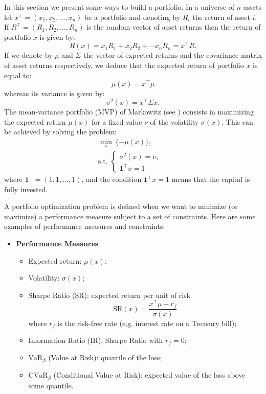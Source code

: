 In this section we present some ways to build a portfolio. In a universe of $n$ assets let $x^\top = (x_1, x_2, \dots, x_n)$ be a portfolio and denoting by $R_i$ the return of asset $i$. If $R^\top=(R_1, R_2, \dots, R_n)$  is the random vector of asset returns then the return of portfolio $x$ is given by:
\[
	R(x) = x_1R_1+x_2R_2+\cdots x_nR_n = x^\top R.
\]
If we denote by $\mu$ and $\Sigma$ the vector of expected returns and the covariance matrix of asset returns respectively, we deduce that the expected return of portfolio $x$ is equal to:
\[
	\mu(x) = x^\top \mu
\]
whereas its variance is given by:
\[
	\sigma^2(x) = x^\top \Sigma x.
\]
The mean-variance portfolio (MVP) of Markowitz (see \cite{Markowitz1952}) consists in maximizing the expected return $\mu(x)$ for a fixed value $\nu$ of the volatility $\sigma(x)$. This can be achieved by solving the problem:
\begin{eqnarray}\label{prob:MVP}
	\min_{x} \, \{- \mu(x)\}, \\
	\mbox{s.t. }\left\{
	\begin{aligned}\nonumber
		\sigma^2(x) = \nu, & \\
		\mathbf{1}^\top x=1       &
	\end{aligned}
	\right.
\end{eqnarray}
where $\textbf{1}^\top =(1,1,\dots,1)$, and the condition $\mathbf{1}^\top x=1$ means that the capital is fully invested.

A portfolio optimization  problem is defined when we want to minimize (or maximize) a performance measure subject to a set of constraints. Here are some examples of performance measures and constraints:

\begin{itemize}
	\item \textbf{Performance Measures}
	      \begin{itemize}
		      \item Expected return: $\mu(x)$;
		      \item Volatility: $\sigma(x)$;
		      \item Sharpe Ratio (SR): expected return per unit of risk
		            \[
			            \mbox{SR}(x) = \frac{x^\top \mu - r_f}{\sigma(x)}
		            \]
		            where $r_f$ is the risk-free rate (e.g. interest rate on a Treasury bill);
		      \item Information Ratio (IR): Sharpe Ratio with $r_f=0$;
		      \item $\mbox{VaR}_\beta$ (Value at Risk): quantile of the loss;
		      \item $\mbox{CVaR}_\beta$ (Conditional Value at Risk): expected value of the loss above some quantile.
	      \end{itemize}
\end{itemize}

